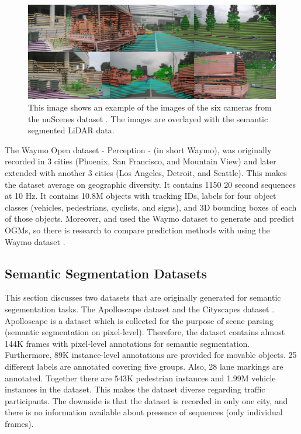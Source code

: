 \begin{figure}[h!]
	\centering
	\includegraphics[width=0.6\linewidth]{Figures/Datasets/NuScenes_Dataset}
	\caption{This image shows an example of the images of the six cameras from the nuScenes dataset \cite{caesar2020nuscenes}. The images are overlayed with the semantic segmented LiDAR data.}  
	\label{fig:dat_nuscenes}
\end{figure}

The Waymo Open dataset - Perception - \cite{sun2020scalability} (in short Waymo), was originally recorded in 3 cities (Phoenix, San Francisco, and Mountain View) and later extended with another 3 cities (Los Angeles, Detroit, and Seattle). This makes the dataset average on geographic diversity. It contains 1150 20 second sequences at 10 Hz. It contains 10.8M objects with tracking IDs, labels for four object classes (vehicles, pedestrians, cyclists, and signs), and 3D bounding boxes of each of those objects. Moreover, \cite{lange2020attention} and \cite{toyungyernsub2020double} used the Waymo dataset to generate and predict \glspl{OGM}, so there is research to compare prediction methods with using the Waymo dataset \cite{sun2020scalability}.


\subsection{Semantic Segmentation Datasets} \label{subsec:data_sem_seg}
This section discusses two datasets that are originally generated for semantic segementation tasks. The Apolloscape dataset \cite{huang2019apolloscape}  and the Cityscapes dataset \cite{cordts2016cityscapes}. \\

Apolloscape \cite{huang2019apolloscape} is a dataset which is collected for the purpose of scene parsing (semantic segmentation on pixel-level). Therefore, the dataset contains almost 144K frames with pixel-level annotations for semantic segmentation. Furthermore, 89K instance-level annotations are provided for movable objects. 25 different labels are annotated covering five groups. Also, 28 lane markings are annotated. Together there are 543K pedestrian instances and 1.99M vehicle instances in the dataset. This makes the dataset diverse regarding traffic participants. The downside is that the dataset is recorded in only one city, and there is no information available about presence of sequences (only individual frames). \\

